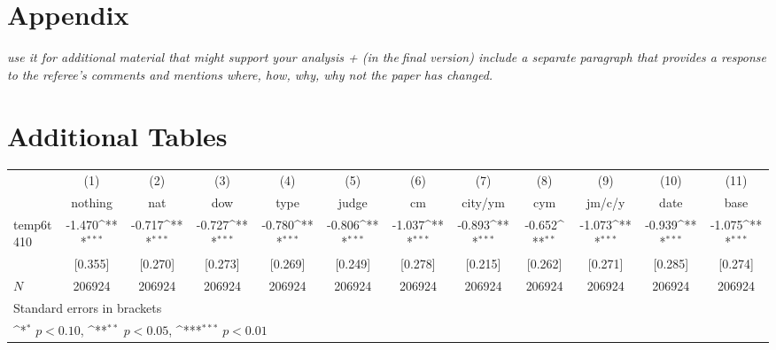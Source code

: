 \documentclass[11pt]{article}
\begin{document}
	\begin{subappendices}
		\appendix
		
		\section*{Appendix}\label{Appendix}
		\textit{use it for additional material that might support your analysis + (in thefinal version) include a separate paragraph that provides a response to the referee's comments and mentions where, how, why, why not the paper has changed.}
		\singlespacing
		\section{Additional Tables}\label{ASec:xxxxx}
		
		
		\begin{center}
			 \label{tab:title} 
			{
			{
				\def\sym#1{\ifmmode^{#1}\else\(^{#1}\)\fi}
				\begin{tabular}{l*{11}{c}}
					\hline\hline
					&\multicolumn{1}{c}{(1)}&\multicolumn{1}{c}{(2)}&\multicolumn{1}{c}{(3)}&\multicolumn{1}{c}{(4)}&\multicolumn{1}{c}{(5)}&\multicolumn{1}{c}{(6)}&\multicolumn{1}{c}{(7)}&\multicolumn{1}{c}{(8)}&\multicolumn{1}{c}{(9)}&\multicolumn{1}{c}{(10)}&\multicolumn{1}{c}{(11)}\\
					&\multicolumn{1}{c}{nothing}&\multicolumn{1}{c}{nat}&\multicolumn{1}{c}{dow}&\multicolumn{1}{c}{type}&\multicolumn{1}{c}{judge}&\multicolumn{1}{c}{cm}&\multicolumn{1}{c}{city/ym}&\multicolumn{1}{c}{cym}&\multicolumn{1}{c}{jm/c/y}&\multicolumn{1}{c}{date}&\multicolumn{1}{c}{base}\\
					\hline
					temp6t410   &      -1.470\sym{***}&      -0.717\sym{***}&      -0.727\sym{***}&      -0.780\sym{***}&      -0.806\sym{***}&      -1.037\sym{***}&      -0.893\sym{***}&      -0.652\sym{**} &      -1.073\sym{***}&      -0.939\sym{***}&      -1.075\sym{***}\\
					&     [0.355]         &     [0.270]         &     [0.273]         &     [0.269]         &     [0.249]         &     [0.278]         &     [0.215]         &     [0.262]         &     [0.271]         &     [0.285]         &     [0.274]         \\
					\hline
					\(N\)       &      206924         &      206924         &      206924         &      206924         &      206924         &      206924         &      206924         &      206924         &      206924         &      206924         &      206924         \\
					\hline\hline
					\multicolumn{12}{l}{\footnotesize Standard errors in brackets}\\
					\multicolumn{12}{l}{\footnotesize \sym{*} \(p<0.10\), \sym{**} \(p<0.05\), \sym{***} \(p<0.01\)}\\
				\end{tabular}
			}
				
}
\end{center}
\end{subappendices}
\end{document}
